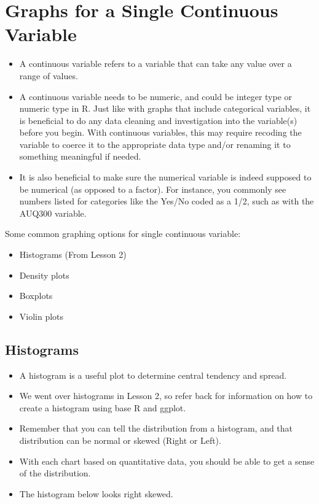 \documentclass[
  letterpaper,
  DIV=11,
  numbers=noendperiod]{scrreprt}
\providecommand{\tightlist}{%
  \setlength{\itemsep}{0pt}\setlength{\parskip}{0pt}}\usepackage{longtable,booktabs,array}
\begin{document}
\section{Graphs for a Single Continuous
Variable}\label{graphs-for-a-single-continuous-variable}

\begin{itemize}
\tightlist
\item
  A continuous variable refers to a variable that can take any value
  over a range of values.
\item
  A continuous variable needs to be numeric, and could be integer type
  or numeric type in R. Just like with graphs that include categorical
  variables, it is beneficial to do any data cleaning and investigation
  into the variable(s) before you begin. With continuous variables, this
  may require recoding the variable to coerce it to the appropriate data
  type and/or renaming it to something meaningful if needed.
\item
  It is also beneficial to make sure the numerical variable is indeed
  supposed to be numerical (as opposed to a factor). For instance, you
  commonly see numbers listed for categories like the Yes/No coded as a
  1/2, such as with the AUQ300 variable.
\end{itemize}

Some common graphing options for single continuous variable:

\begin{itemize}
\tightlist
\item
  Histograms (From Lesson 2)
\item
  Density plots
\item
  Boxplots
\item
  Violin plots
\end{itemize}

\subsection{Histograms}\label{histograms-1}

\begin{itemize}
\item
  A histogram is a useful plot to determine central tendency and spread.
\item
  We went over histograms in Lesson 2, so refer back for information on
  how to create a histogram using base R and ggplot.
\item
  Remember that you can tell the distribution from a histogram, and that
  distribution can be normal or skewed (Right or Left).\\
\item
  With each chart based on quantitative data, you should be able to get
  a sense of the distribution.
\item
  The histogram below looks right skewed.
\end{itemize}
\end{document}
